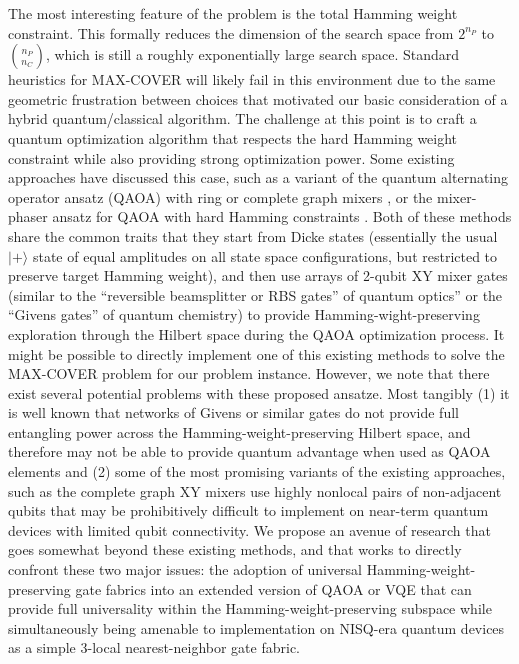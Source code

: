 \documentclass[aps,pra,twocolumn,superscriptaddress,groupedaddress]{revtex4}  %
\begin{document}
The most interesting feature of the problem is the total Hamming weight
constraint. This formally reduces the dimension of the search space from
$2^{n_{P}}$ to ${n_{P} \choose n_{C} }$, which is still a roughly exponentially
large search space. Standard heuristics for MAX-COVER will likely fail in this
environment due to the same geometric frustration between choices that motivated
our basic consideration of a hybrid quantum/classical algorithm. The challenge
at this point is to craft a quantum optimization algorithm that respects the
hard Hamming weight constraint while also providing strong optimization power.
Some existing approaches have discussed this case, such as a variant of the
quantum alternating operator ansatz (QAOA) with ring or complete graph mixers
\cite{cook2020quantum},
or the mixer-phaser ansatz for QAOA with hard Hamming constraints \cite{larose2021mixer}. Both of these
methods share the common traits that they start from Dicke states (essentially
the usual $|+\rangle$ state of equal amplitudes on all state space
configurations, but restricted to preserve target Hamming weight), and then use
arrays of 2-qubit XY mixer gates (similar to the ``reversible beamsplitter or RBS
gates'' of quantum optics'' or the ``Givens gates'' of quantum chemistry) to
provide Hamming-wight-preserving exploration through the Hilbert space during
the QAOA optimization process. It might be possible to directly implement one of
this existing methods to solve the MAX-COVER problem for our problem instance.
However, we note that there exist several potential problems with these
proposed ansatze. Most tangibly (1) it is well known that networks of Givens or
similar gates do not provide full entangling power across the
Hamming-weight-preserving Hilbert space, and therefore may not be able to
provide quantum advantage when used as QAOA elements and (2) some of the most
promising variants of the existing approaches, such as the complete graph XY
mixers use highly nonlocal pairs of non-adjacent qubits that may be
prohibitively difficult to implement on near-term quantum devices with limited
qubit connectivity. We propose an avenue of research that goes somewhat beyond
these existing methods, and that works to directly confront these two major
issues: the adoption of universal Hamming-weight-preserving gate fabrics into an
extended version of QAOA or VQE that can provide full universality within the
Hamming-weight-preserving subspace while simultaneously being amenable to
implementation on NISQ-era quantum devices as a simple 3-local nearest-neighbor
gate fabric.  
\end{document}
